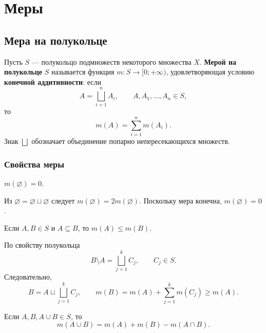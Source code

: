 \clearpage
\begingroup
{}
\section{Меры}

\subsection{Мера на полукольце}

\begin{definition}
    Пусть $S$ --- полукольцо подмножеств некоторого множества $X$.
    \textbf{Мерой на полукольце} $S$ называется функция
    $m\colon S\to[0;+\infty)$, удовлетворяющая условию
    \textbf{конечной аддитивности}: если
    \[
        A=\bigsqcup_{i=1}^{n}A_i,\qquad A,A_1,\ldots,A_n\in S,
    \]
    то
    \[
        m(A)=\sum_{i=1}^{n}m(A_i).
    \]
    Знак $\bigsqcup$ обозначает объединение попарно
    непересекающихся множеств.
\end{definition}

\subsubsection{Свойства меры}

\begin{theorem}
    $m(\varnothing)=0$.
\end{theorem}

\begin{Proof}
    Из $\varnothing=\varnothing\sqcup\varnothing$ следует
    $m(\varnothing)=2m(\varnothing)$. Поскольку мера конечна,
    $m(\varnothing)=0$.
\end{Proof}

\begin{theorem}[Монотонность]
    Если $A,B\in S$ и $A\subseteq B$, то $m(A)\leq m(B)$.
\end{theorem}

\begin{Proof}
    По свойству полукольца
    \[
        B\setminus A=\bigsqcup_{j=1}^{k}C_j,\qquad C_j\in S.
    \]
    Следовательно,
    \[
        B=A\sqcup\bigsqcup_{j=1}^{k}C_j,
        \qquad m(B)=m(A)+\sum_{j=1}^{k}m(C_j)\geq m(A).
    \]
\end{Proof}

\begin{theorem}
    Если $A,B,A\cup B\in S$, то
    \[
        m(A\cup B)=m(A)+m(B)-m(A\cap B).
    \]
\end{theorem}

